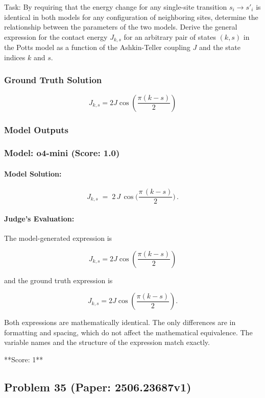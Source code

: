 \documentclass[10pt]{article}
\begin{document}
Task:
By requiring that the energy change for any single-site transition $s_i \to s'_i$ is identical in both models for any configuration of neighboring sites, determine the relationship between the parameters of the two models. Derive the general expression for the contact energy $J_{k,s}$ for an arbitrary pair of states $(k,s)$ in the Potts model as a function of the Ashkin-Teller coupling $J$ and the state indices $k$ and $s$.

\subsubsection*{Ground Truth Solution}
\[ \boxed{J_{k,s} = 2J \cos\left(\frac{\pi(k-s)}{2}\right)} \]

\subsubsection*{Model Outputs}
\subsubsection*{Model: o4-mini (Score: 1.0)}
\paragraph*{Model Solution:}
\[ \displaystyle 
     J_{k,s}
     \;=\;
     2\,J\,
     \cos\!\biggl(\frac{\pi\,(k-s)}{2}\biggr)\,. \]

\paragraph*{Judge's Evaluation:}

The model-generated expression is

\[
J_{k,s} = 2 J \cos\left(\frac{\pi (k - s)}{2}\right)
\]

and the ground truth expression is

\[
J_{k,s} = 2J \cos\left(\frac{\pi(k-s)}{2}\right).
\]

Both expressions are mathematically identical. The only differences are in formatting and spacing, which do not affect the mathematical equivalence. The variable names and the structure of the expression match exactly.

**Score: 1**

\newpage
\subsection*{Problem 35 (Paper: 2506.23687v1)}
\end{document}

